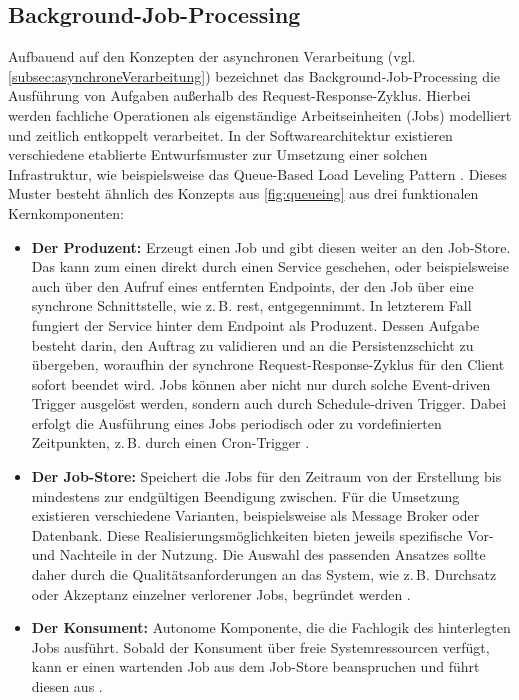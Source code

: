 \subsection{Background-Job-Processing}
\label{subsec:backgroundJobs}
Aufbauend auf den Konzepten der asynchronen Verarbeitung (vgl. \cref{subsec:asynchroneVerarbeitung}) bezeichnet das
Background-Job-Processing die Ausführung von Aufgaben außerhalb des Request-Response-Zyklus.
Hierbei werden fachliche Operationen als eigenständige Arbeitseinheiten (Jobs) modelliert und zeitlich entkoppelt verarbeitet.
In der Softwarearchitektur existieren verschiedene etablierte Entwurfsmuster zur Umsetzung einer solchen Infrastruktur, wie
beispielsweise das Queue-Based Load Leveling Pattern \parencite{microsoft_corporation_hrsg_queue-based_2026}.
Dieses Muster besteht ähnlich des Konzepts aus \cref{fig:queueing} aus drei funktionalen Kernkomponenten:
\begin{itemize}
    \item \textbf{Der Produzent:} Erzeugt einen Job und gibt diesen weiter an den Job-Store.
    Das kann zum einen direkt durch einen Service geschehen, oder beispielsweise auch über den Aufruf eines entfernten Endpoints,
    der den Job über eine synchrone Schnittstelle, wie z.\,B. \gls{rest}, entgegennimmt.
    In letzterem Fall fungiert der Service hinter dem Endpoint als Produzent.
    Dessen Aufgabe besteht darin, den Auftrag zu validieren und an die Persistenzschicht zu übergeben, woraufhin der synchrone
    Request-Response-Zyklus für den Client sofort beendet wird.
    Jobs können aber nicht nur durch solche Event-driven Trigger ausgelöst werden, sondern auch durch Schedule-driven Trigger.
    Dabei erfolgt die Ausführung eines Jobs periodisch oder zu vordefinierten Zeitpunkten, z.\,B. durch einen Cron-Trigger
    \parencite{microsoft_corporation_hrsg_best_2026}.

    \item \textbf{Der Job-Store:} Speichert die Jobs für den Zeitraum von der Erstellung bis mindestens zur endgültigen Beendigung zwischen.
    Für die Umsetzung existieren verschiedene Varianten, beispielsweise als Message Broker oder Datenbank.
    Diese Realisierungsmöglichkeiten bieten jeweils spezifische Vor- und Nachteile in der Nutzung.
    Die Auswahl des passenden Ansatzes sollte daher durch die Qualitätsanforderungen an das System, wie z.\,B. Durchsatz oder
    Akzeptanz einzelner verlorener Jobs, begründet werden \parencite[Kap.~11]{kleppmann_designing_2017}.

    \item \textbf{Der Konsument:} Autonome Komponente, die die Fachlogik des hinterlegten Jobs ausführt.
    Sobald der Konsument über freie Systemressourcen verfügt, kann er einen wartenden Job aus dem Job-Store beanspruchen und führt
    diesen aus \parencite{microsoft_corporation_hrsg_queue-based_2026}.
\end{itemize}
